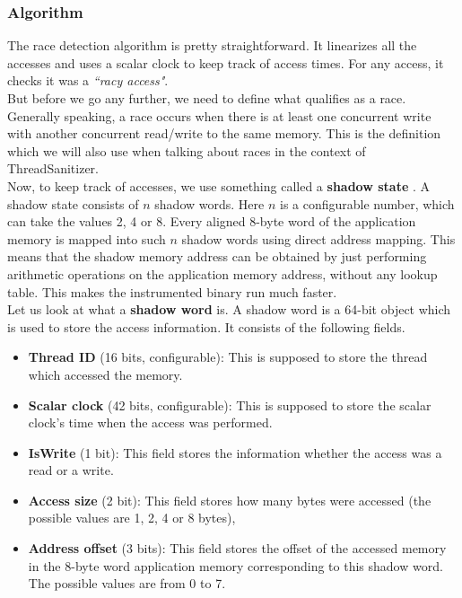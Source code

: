 \documentclass{btp}
\begin{document}
\subsubsection{Algorithm}
\label{sec:algo}

The race detection algorithm is pretty straightforward. It linearizes all the accesses and uses a scalar clock to keep track of access times. For any access, it checks it was a \textit{``racy access"}.
\\
\newline
But before we go any further, we need to define what qualifies as a race. Generally speaking, a race occurs when there is at least one concurrent write with another concurrent read/write to the same memory. This is the definition which we will also use when talking about races in the context of ThreadSanitizer.
\\
\newline
Now, to keep track of accesses, we use something called a \textbf{shadow state} \cite{shadow-state}. A shadow state consists of $n$ shadow words. Here $n$ is a configurable number, which can take the values 2, 4 or 8. Every aligned 8-byte word of the application memory is mapped into such $n$ shadow words using direct address mapping. This means that the shadow memory address can be obtained by just performing arithmetic operations on the application memory address, without any lookup table. This makes the instrumented binary run much faster.
\\
\newline
Let us look at what a \textbf{shadow word} is. A shadow word is a 64-bit object which is used to store the access information. It consists of the following fields.

\begin{itemize}
	\item \textbf{Thread ID} (16 bits, configurable): This is supposed to store the thread which accessed the memory.
	\item \textbf{Scalar clock} (42 bits, configurable): This is supposed to store the scalar clock's time when the access was performed.
	\item \textbf{IsWrite} (1 bit): This field stores the information whether the access was a read or a write.
	\item \textbf{Access size} (2 bit): This field stores how many bytes were accessed (the possible values are 1, 2, 4 or 8 bytes),
	\item \textbf{Address offset} (3 bits): This field stores the offset of the accessed memory in the 8-byte word application memory corresponding to this shadow word. The possible values are from 0 to 7.
\end{itemize}
\end{document}

